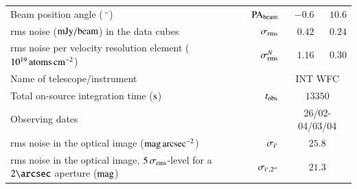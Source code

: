 \documentclass[oldversion]{aa}
\renewcommand{\deg}{\hbox{$^\circ$}}
\begin{document}
\begin{table}[htbp]
\begin{center}
\begin{tabular}{l r r r}
Beam position angle ($\,\deg$)                                                                    & ${\rm PA}_{\rm beam}$                       & $ -0.6  $       & $ 10.6  $           \\
rms noise (${\rm mJy}/{\rm beam}$) in the data cubes                                              & $\sigma_{\rm rms}$                          & $ 0.42  $       & $ 0.24  $           \\
rms noise per velocity resolution element ($10^{19}\,{\rm atoms}\,{\rm cm}^{-2}$)                 & $\sigma_{\rm rms}^{N}$                      & $ 1.16  $       & $ 0.30  $           \\
\hline                               
Name of telescope/instrument                                                                      &                                             & \multicolumn{2}{c}{INT WFC}         \\
Total on-source integration time ($\rm s$)                                                        & $t_{\rm obs}$                               & \multicolumn{2}{c}{$13350$}        \\
Observing dates                                                                                   &                                             & \multicolumn{2}{c}{26/02-04/03/04}  \\
rms noise in the optical image (${\rm mag}\,{\rm arcsec}^{-2}$)                                   & $\sigma_{{\rm i}^\prime} $                  & \multicolumn{2}{c}{$ 25.8 $}        \\
rms noise in the optical image, $5\,\sigma_{\rm rms}$-level for a $2\arcsec$ aperture ($\rm mag$) & $\sigma_{{\rm i}^\prime,2^{\prime\prime}} $ & \multicolumn{2}{c}{$ 21.3 $}        \\
\hline
\end{tabular}
\end{center}
\end{table}
%
%
\end{document}
